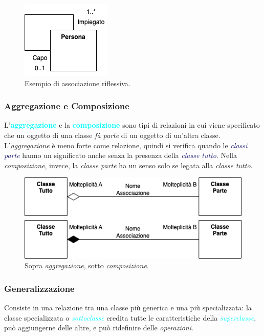 \begin{figure}[h]
    \centering
    \includegraphics[scale=0.7]{img/riflessiva.png}
    \caption{Esempio di associazione riflessiva.}
\end{figure}

\newpage
\subsubsection{Aggregazione e Composizione}

L'\textbf{\textcolor{cyan}{aggregazione}} e la \textbf{\textcolor{cyan}{composizione}}
sono tipi di relazioni in cui viene specificato che un oggetto di una classe \emph{fà parte} di un oggetto
di un'altra classe. L'\emph{aggregazione} è meno forte come relazione, quindi si verifica quando le \emph{\textcolor{MidnightBlue}{classi parte}} hanno un
significato anche senza la presenza della \emph{\textcolor{MidnightBlue}{classe tutto}}. Nella \emph{composizione}, invece, la \emph{classe parte} ha un senso solo
se legata alla \emph{classe tutto}.

\begin{figure}[h]
    \centering
    \includegraphics[scale=0.7]{img/aggrecomp.png}
    \caption{Sopra \emph{aggregazione}, sotto \emph{composizione}.}
\end{figure}

\subsubsection{Generalizzazione}
Consiste in una relazione tra una classe più generica e una più specializzata: la classe specializzata o
\emph{\textcolor{cyan}{sottoclasse}} eredita tutte le caratteristiche della \emph{\textcolor{cyan}{superclasse}}, può aggiungerne delle altre, e
può ridefinire delle \emph{operazioni}.


